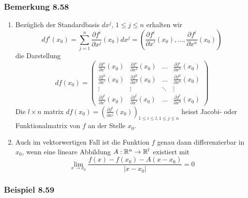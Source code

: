\subsubsection*{Bemerkung 8.58}
\begin{enumerate}
\item Bezüglich der Standardbasis $dx^j$, $1\leq j\leq n$ erhalten wir
\[d{f^i}\left( {{x_0}} \right) = \sum\limits_{j = 1}^n {\frac{{\partial {f^i}}}{{\partial {x^j}}}\left( {{x_0}} \right)d{x^j} = \left( {\frac{{\partial {f^i}}}{{\partial x'}}\left( {{x_0}} \right), \ldots ,\frac{{\partial {f^i}}}{{\partial {x^n}}}\left( {{x_0}} \right)} \right)} \]
die Darstellung
\[df\left( {{x_0}} \right) = \left( {\begin{array}{*{20}{c}}
{\frac{{\partial f'}}{{\partial x'}}\left( {{x_0}} \right)}&{\frac{{\partial f'}}{{\partial {x^2}}}\left( {{x_0}} \right)}& \ldots &{\frac{{\partial f'}}{{\partial {x^n}}}\left( {{x_0}} \right)}\\
{\frac{{\partial {f^2}}}{{\partial x'}}\left( {{x_0}} \right)}&{\frac{{\partial {f^2}}}{{\partial {x^2}}}\left( {{x_0}} \right)}& \ldots &{\frac{{\partial {f^2}}}{{\partial {x^n}}}\left( {{x_0}} \right)}\\
 \vdots & \vdots & \ddots & \vdots \\
{\frac{{\partial {f^l}}}{{\partial x'}}\left( {{x_0}} \right)}&{\frac{{\partial {f^l}}}{{\partial x'}}\left( {{x_0}} \right)}& \ldots &{\frac{{\partial {f^l}}}{{\partial {x^n}}}\left( {{x_0}} \right)}
\end{array}} \right)\]
Die $l\times n$ matrix $df\left( x_0\right) = {\left( \frac{\partial f^i}{\partial x^j}\left( x_0\right)\right)}_{1\leq i\leq l, 1\leq j\leq n}$ heisst Jacobi- oder Funktionalmatrix von $f$ an der Stelle $x_0$.
\item Auch im vektorwertigen Fall ist die Funktion $f$ genau dann differenzierbar in $x_0$, wenn eine lineare Abbildung $A:\mathbb{R}^n\to\mathbb{R}^l$ existiert mit
\[\mathop {\lim }\limits_{x \to {x_0}} \frac{{f\left( x \right) - f\left( {{x_0}} \right) - A\left( {x - {x_0}} \right)}}{{\left| {x - {x_0}} \right|}} = 0\]
\end{enumerate}

\subsubsection*{Beispiel 8.59}

